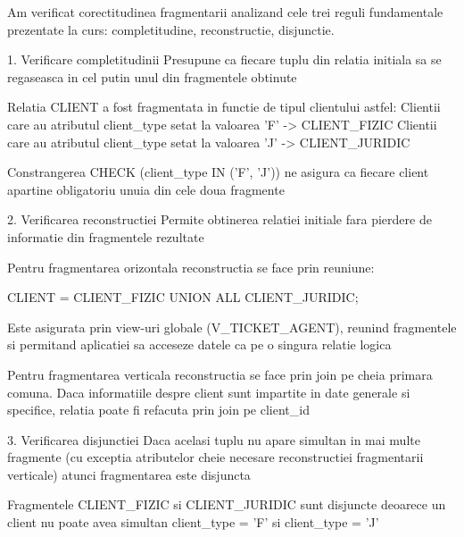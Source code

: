 Am verificat corectitudinea fragmentarii analizand cele trei reguli fundamentale prezentate la curs:
completitudine, reconstructie, disjunctie.

1. Verificare completitudinii
Presupune ca fiecare tuplu din relatia initiala sa se regaseasca in cel putin unul din fragmentele obtinute

Relatia CLIENT a fost fragmentata in functie de tipul clientului astfel:
Clientii care au atributul client_type setat la valoarea 'F' -> CLIENT_FIZIC
Clientii care au atributul client_type setat la valoarea 'J' -> CLIENT_JURIDIC

Constrangerea CHECK (client_type IN ('F', 'J')) ne asigura ca fiecare client apartine obligatoriu unuia
din cele doua fragmente

2. Verificarea reconstructiei
Permite obtinerea relatiei initiale fara pierdere de informatie din fragmentele rezultate

Pentru fragmentarea orizontala reconstructia se face prin reuniune:

CLIENT = CLIENT_FIZIC UNION ALL CLIENT_JURIDIC;

Este asigurata prin view-uri globale (V_TICKET_AGENT), reunind fragmentele si permitand aplicatiei sa
acceseze datele ca pe o singura relatie logica

Pentru fragmentarea verticala reconstructia se face prin join pe cheia primara comuna. Daca informatiile
despre client sunt impartite in date generale si specifice, relatia poate fi refacuta prin join pe client_id

3. Verificarea disjunctiei
Daca acelasi tuplu nu apare simultan in mai multe fragmente (cu exceptia atributelor cheie necesare
reconstructiei fragmentarii verticale) atunci fragmentarea este disjuncta

Fragmentele CLIENT_FIZIC si CLIENT_JURIDIC sunt disjuncte deoarece un client nu poate avea simultan
client_type = 'F' si client_type = 'J'